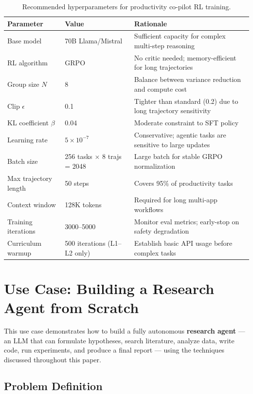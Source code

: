 \begin{table}[ht!]
\centering
\caption{Recommended hyperparameters for productivity co-pilot RL training.}
\begin{tabular}{@{}lp{5cm}p{8cm}@{}}
\toprule
\textbf{Parameter} & \textbf{Value} & \textbf{Rationale} \\
\midrule
Base model & 70B Llama/Mistral & Sufficient capacity for complex multi-step reasoning \\
RL algorithm & GRPO & No critic needed; memory-efficient for long trajectories \\
Group size $N$ & 8 & Balance between variance reduction and compute cost \\
Clip $\epsilon$ & 0.1 & Tighter than standard (0.2) due to long trajectory sensitivity \\
KL coefficient $\beta$ & 0.04 & Moderate constraint to SFT policy \\
Learning rate & $5 \times 10^{-7}$ & Conservative; agentic tasks are sensitive to large updates \\
Batch size & 256 tasks $\times$ 8 trajs = 2048 & Large batch for stable GRPO normalization \\
Max trajectory length & 50 steps & Covers 95\% of productivity tasks \\
Context window & 128K tokens & Required for long multi-app workflows \\
Training iterations & 3000--5000 & Monitor eval metrics; early-stop on safety degradation \\
Curriculum warmup & 500 iterations (L1--L2 only) & Establish basic API usage before complex tasks \\
\bottomrule
\end{tabular}
\end{table}

\newpage
\section{Use Case: Building a Research Agent from Scratch}
\label{use-case-building-a-research-agent-from-scratch}

This use case demonstrates how to build a fully autonomous \textbf{research agent} --- an LLM that can formulate hypotheses, search literature, analyze data, write code, run experiments, and produce a final report --- using the techniques discussed throughout this paper.

\subsection{Problem Definition}
\label{problem-definition}

